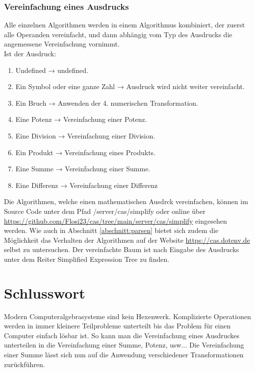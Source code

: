 \documentclass[11pt]{article}
\begin{document}
\subsubsection{Vereinfachung eines Ausdrucks}
Alle einzelnen Algorithmen werden in einem Algorithmus kombiniert, 
der zuerst alle Operanden vereinfacht, und dann abhängig vom Typ des Ausdrucks die angemessene Vereinfachung vornimmt. \\
\newline
Ist der Ausdruck:
\begin{enumerate}
  \item Undefined → undefined.
  \item Ein Symbol oder eine ganze Zahl → Ausdruck wird nicht weiter vereinfacht.
  \item Ein Bruch → Anwenden der 4. numerischen Transformation. 
  \item Eine Potenz → Vereinfachung einer Potenz.
  \item Eine Division → Vereinfachung einer Division.
  \item Ein Produkt → Vereinfachung eines Produkts.
  \item Eine Summe → Vereinfachung einer Summe.
  \item Eine Differenz → Vereinfachung einer Differenz
\end{enumerate}

Die Algorithmen, welche einen mathematischen Ausdrck vereinfachen, können im Source Code unter
dem Pfad /server/cas/simplify oder online über \url{https://github.com/Flosi23/cas/tree/main/server/cas/simplify}
eingesehen werden.
Wie auch in Abschnitt \ref{abschnitt:parsen} bietet sich zudem die Möglichkeit das Verhalten der Algorithmen auf der Website 
\url{https://cas.dotenv.de} selbst zu untersuchen. Der vereinfachte Baum ist nach Eingabe des
Ausdrucks unter dem Reiter \glqq Simplified Expression Tree\grqq{} zu finden.

\section{Schlusswort}

Modern Computeralgebrasysteme sind kein Hexenwerk. Komplizierte Operationen 
werden in immer kleinere Teilprobleme unterteilt bis das 
Problem für einen Computer einfach lösbar ist. So kann man die Vereinfachung eines
Ausdruckes unterteilen in die Vereinfachung einer Summe, Potenz, usw... Die Vereinfachung
einer Summe lässt sich nun auf die Anwendung verschiedener Transformationen zurückführen.\\
\end{document}
